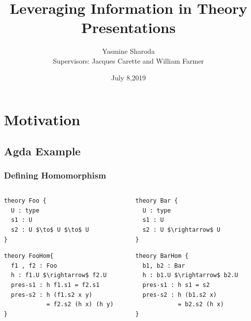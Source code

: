 \documentclass[t,12pt,numbers,fleqn,usenames,xcolor=dvipsnames]{beamer}
\title{Leveraging Information in Theory Presentations}
\author{Yasmine Sharoda\\ \vspace{0.5cm} Supervisors: Jacques Carette and William Farmer}
\institute[]{Department of Computing and Software, McMaster University}
\date{July 8,2019}
\begin{document}
\begin{frame}
\titlepage
\end{frame}

\section{Motivation}

\subsection{Agda Example}
\begin{frame}[fragile]
\frametitle{Defining Homomorphism}
\begin{columns}
	\begin{column}{0.45\textwidth}
\scriptsize		
		\begin{lstlisting}[mathescape]
theory Foo { 
  U : type 
  s1 : U 
  s2 : U $\to$ U $\to$ U
}
		\end{lstlisting}
\pause		
		\begin{lstlisting}
theory FooHom{
  f1 , f2 : Foo 
  h : f1.U $\rightarrow$ f2.U 
  pres-s1 : h f1.s1 = f2.s1  
  pres-s2 : h (f1.s2 x y) 
            = f2.s2 (h x) (h y)
}
		\end{lstlisting}
	\end{column}
	\begin{column}{0.45\textwidth}
\pause		
\scriptsize
	 	\begin{lstlisting}
theory Bar {
  U : type 
  s1 : U 
  s2 : U $\rightarrow$ U 
}
	 	\end{lstlisting}
\pause
		\begin{lstlisting}
theory BarHom { 
  b1, b2 : Bar 
  h : b1.U $\rightarrow$ b2.U 
  pres-s1 : h s1 = s2  
  pres-s2 : h (b1.s2 x) 
            = b2.s2 (h x)
}
		\end{lstlisting}
	\end{column}
\end{columns}
\end{frame}
\end{document}
